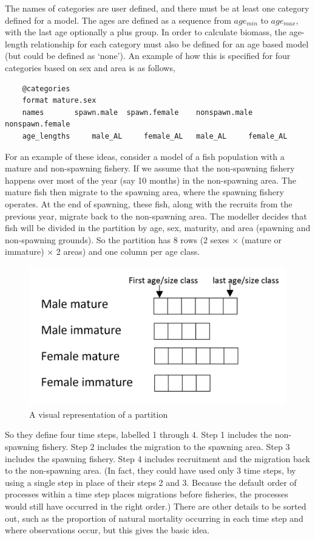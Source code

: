 The names of categories are user defined, and there must be at least one category defined for a model. The ages are defined as a sequence from $age_{min}$ to $age_{max}$, with the last age optionally a plus group. In order to calculate biomass, the age-length relationship for each category must also be defined for an age based model (but could be defined as `none'). An example of how this is specified for four categories based on sex and area is as follows,
{\small{\begin{verbatim}
	@categories 
	format mature.sex 
	names 		spawn.male 	spawn.female 	nonspawn.male 	nonspawn.female
	age_lengths 	male_AL		female_AL   male_AL		female_AL  
\end{verbatim}}}	

For an example of these ideas, consider a model of a fish population with a mature and non-spawning fishery. If we assume that the non-spawning fishery happens over most of the year (say 10 months) in the non-spawning area. The mature fish then migrate to the spawning area, where the spawning fishery operates. At the end of spawning, these fish, along with the recruits from the previous year, migrate back to the non-spawning area. The modeller decides that fish will be divided in the partition by age, sex, maturity, and area (spawning and non-spawning grounds). So the partition has 8 rows (2 sexes × (mature or immature) × 2 areas) and one column per age class. 

\begin{figure}[H]
	\centering
	\includegraphics[scale=0.3]{Figures/partition.png}
		\caption{A visual representation of a partition}\label{Fig:part}
\end{figure}

So they define four time steps, labelled 1 through 4. Step 1 includes the non-spawning fishery. Step 2 includes the migration to the spawning area. Step 3 includes the spawning fishery. Step 4 includes recruitment and the migration back to the non-spawning area. (In fact, they could have used only 3 time steps, by using a single step in place of their steps 2 and 3. Because the default order of processes within a time step places migrations before fisheries, the processes would still have occurred in the right order.) There are other details to be sorted out, such as the proportion of natural mortality occurring in each time step and where observations occur, but this gives the basic idea.

